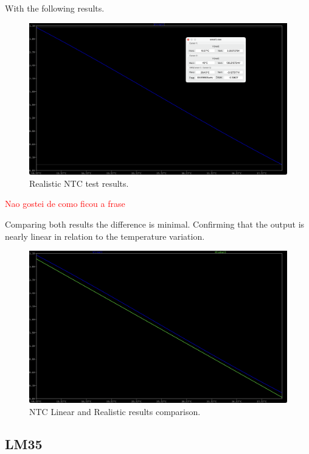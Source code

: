 \documentclass[12pt]{article}
\begin{document}
    With the following results.
    
    \begin{figure}[H] 
        \centering
        \includegraphics*[scale = 0.3]{images/NTCRealRes.png}
        \caption{Realistic NTC test results.}
        \label{wrap-fig:1}
    \end{figure}

    \textcolor{red}{Nao gostei de como ficou a frase }
    
    Comparing both results the difference is minimal.
    Confirming that the output is nearly linear in relation to the temperature variation.
    
    \begin{figure}[H] 
        \centering
        \includegraphics*[scale = 0.3]{images/NTCRealLinearComp.png}
        \caption{NTC Linear and Realistic results comparison.}
        \label{wrap-fig:1}
    \end{figure}


\subsection{LM35}
\end{document}
